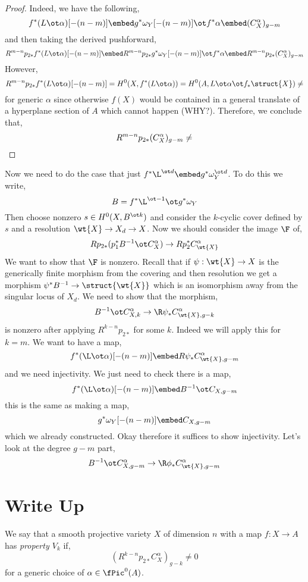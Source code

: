 \documentclass[12pt]{article}
\begin{document}
\begin{proof}
Indeed, we have the following,
\[ f^* (L \ot \alpha)[-(n-m)] \embed g^* \omega_Y [-(n-m)] \ot f^* \alpha \embed (C_X^\alpha)_{g-m} \]
and then taking the derived pushforward,
\[ R^{m-n} p_{2*} f^* (L \ot \alpha)[-(n-m)] \embed R^{m-n} p_{2*} g^* \omega_Y [-(n-m)] \ot f^* \alpha \embed R^{m-n} p_{2*} (C_X^\alpha)_{g-m} \]
However, 
\[  R^{m-n} p_{2*} f^* (L \ot \alpha)[-(n-m)] = H^0(X, f^* (L \ot \alpha)) = H^0(A, L \ot \alpha \ot f_* \struct{X}) \neq \empty \]
for generic $\alpha$ since otherwise $f(X)$ would be contained in a general translate of a hyperplane section of $A$ which cannot happen (WHY?). Therefore, we conclude that,
\[ R^{m-n} p_{2*} (C_X^\alpha)_{g-m} \neq \empty \]
\end{proof}

Now we need to do the case that just $f^* \L^{\ot d} \embed g^* \omega_Y^{\ot d}$. To do this we write,
\[ B = f^* \L^{\ot -1} \ot g^* \omega_Y \]
Then choose nonzero $s \in H^0(X, B^{\ot k})$ and consider the $k$-cyclic cover defined by $s$ and a resolution $\wt{X} \to X_d \to X$. Now we should consider the image $\F$ of,
\[ R p_{2*} (p_1^* B^{-1} \ot C_X^\alpha) \to R p_2^* C^\alpha_{\wt{X}} \]
We want to show that $\F$ is nonzero. Recall that if $\psi : \wt{X} \to X$ is the generically finite morphism from the covering and then resolution we get a morphism $\psi^{*} B^{-1} \to \struct{\wt{X}}$ which is an isomorphism away from the singular locus of $X_d$. We need to show that the morphism,
\[ B^{-1} \ot C_{X, k}^\alpha \to \R \psi_* C^\alpha_{\wt{X}, g-k} \]
is nonzero after applying $R^{k-n} p_{2*}$ for some $k$. Indeed we will apply this for $k = m$. We want to have a map,
\[ f^* (\L \ot \alpha)[-(n-m)] \embed R \psi_* C^\alpha_{\wt{X}, g-m} \]
and we need injectivity. We just need to check there is a map,
\[ f^* (\L \ot \alpha)[-(n-m)] \embed B^{-1} \ot C_{X, g-m} \]
this is the same as making a map,
\[ g^* \omega_Y [-(n-m)] \embed C_{X, g-m} \]
which we already constructed. Okay therefore it suffices to show injectivity. Let's look at the degree $g-m$ part,
\[ B^{-1} \ot C_{X, g-m}^\alpha \to \R \phi_* C^\alpha_{\wt{X}, g-m} \]


\section{Write Up}

\begin{defn}
We say that a smooth projective variety $X$ of dimension $n$ with a map $f : X \to A$ has \textit{property $V_k$} if,
\[ (R^{k-n} p_{2*} C_X^\alpha)_{g-k} \neq 0 \]
for a generic choice of $\alpha \in \fPic^0(A)$.
\end{defn}
\end{document}
